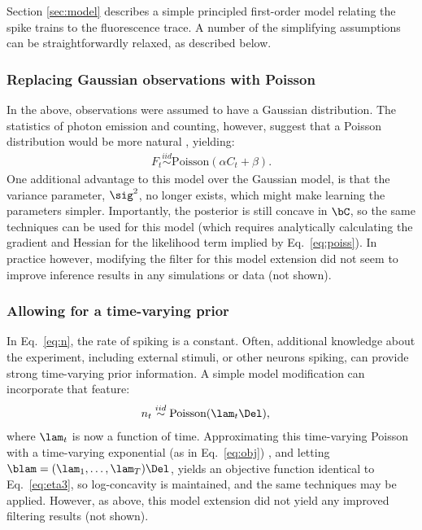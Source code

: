 Section \ref{sec:model} describes a simple principled first-order model relating the spike trains to the fluorescence trace. A number of the simplifying assumptions can be straightforwardly relaxed, as described below.


\subsubsection{Replacing Gaussian observations with Poisson}

In the above, observations were assumed to have a Gaussian distribution.  The statistics of photon emission and counting, however, suggest that a Poisson distribution would be more natural \cite{SjulsonMiesenbock07}, yielding:
\begin{align} \label{eq:poiss}
	F_t \overset{iid}{\sim}\text{Poisson}(\alpha C_t + \beta).
\end{align}
One additional advantage to this model over the Gaussian model, is that the variance parameter, $\sig^2$, no longer exists, which might make learning the parameters simpler.  Importantly, the posterior is still concave in $\bC$, so the same techniques can be used for this model (which requires analytically calculating the gradient and Hessian for the likelihood term implied by Eq.~\eqref{eq:poiss}).  In practice however, modifying the filter for this model extension did not seem to improve inference results in any simulations or data (not shown).

\subsubsection{Allowing for a time-varying prior}

In Eq.~\eqref{eq:n}, the rate of spiking is a constant.  Often, additional knowledge about the experiment, including external stimuli, or other neurons spiking, can provide strong time-varying prior information.  A simple model modification can incorporate that feature:
\begin{align}
	n_t &\overset{iid}{\sim} \text{Poisson}(\lam_t \Del),
\end{align}
where $\lam_t$ is now a function of time.  Approximating this time-varying Poisson with a time-varying exponential (as in Eq.~\eqref{eq:obj}) , and letting $\blam = (\lam_1, \ldots, \lam_T) \Del$, yields an objective function identical to Eq.~\eqref{eq:eta3}, so log-concavity is maintained, and the same techniques may be applied.  However, as above, this model extension did not yield any improved filtering results (not shown).

